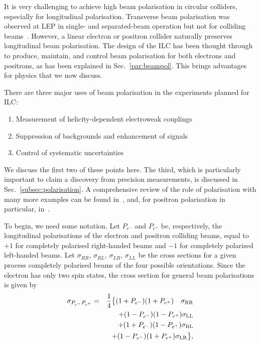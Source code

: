 It is very challenging to achieve high beam polarisation in circular colliders, especially for longitudinal polarisation.   Transverse beam polarisation was observed at LEP in single- and separated-beam operation but not for 
colliding beams~\cite{Assmann:1998qb}.  However,  a linear electron or positron
collider naturally preserves longitudinal beam polarisation.    The design of the 
ILC has been thought through  to produce, maintain, and control 
beam polarisation for both electrons and positrons, as has been explained in 
Sec.~\ref{par:beampol}.  This brings advantages for physics that we now discuss.

There are three major uses of beam polarisation in the experiments planned for ILC:
\begin{enumerate}
\item  Measurement of helicity-dependent electroweak couplings
\item Suppression of backgrounds and enhancement of signals
\item  Control of systematic uncertainties
\end{enumerate}
We discuss the first two of these points here.  The third, which is particularly 
important to claim a discovery from  precision measurements, is discussed in Sec.~\ref{subsec:polarisation}.  A comprehensive review of the role of polarisation with many more examples can be found in~\cite{MoortgatPick:2005cw}, and, for  positron polarisation in particular, in~\cite{Fujii:2018mli}. 

To begin, we need some notation. Let $P_{e^-}$ and $P_{e^+}$ be, respectively, the longitudinal polarisations of the electron and positron colliding beams, equal to $+1$ for completely polarised right-handed beams and $-1$ for completely polarised left-handed beams.   Let $\sigma_{RR}$, $\sigma_{RL}$, $\sigma_{LR}$, $\sigma_{LL}$ be the cross sections for a given process completely polarised beams of the four possible orientations.  Since the electron has only two spin  states, the 
cross section for general beam  polarisations is given by 
\begin{eqnarray}
\sigma_{P_{e^-}P_{e^+}} &=& \frac{1}{4}\bigl\{
     (1+P_{e^-})(1+P_{e^+}) \quad \sigma_{\mathrm{RR}}  \nonumber \\
&& + (1-P_{e^-})(1-P_{e^+}) \sigma_{\mathrm{LL}} \nonumber \\
&& + (1+P_{e^-})(1-P_{e^+}) \sigma_{\mathrm{RL}} \nonumber \\ 
&& + (1-P_{e^-})(1+P_{e^+}) \sigma_{\mathrm{LR}} \bigr\},
\label{eq:pol:xsec}
\end{eqnarray}

